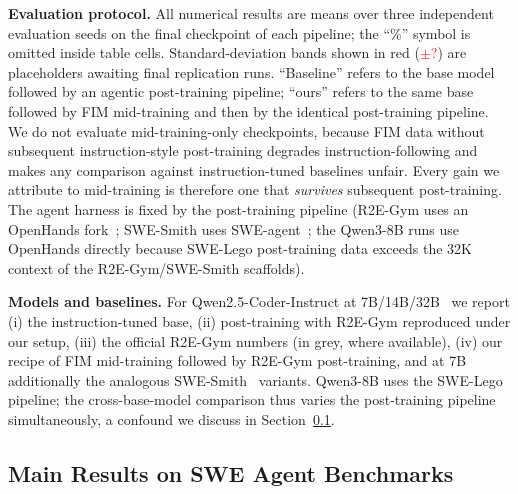 \textbf{Evaluation protocol.}
All numerical results are means over three independent evaluation seeds
on the final checkpoint of each pipeline; the ``\%'' symbol is omitted
inside table cells. Standard-deviation bands shown in red
(\textcolor{red}{$\pm$?}) are placeholders awaiting final replication
runs. ``Baseline'' refers to the base model followed by an agentic
post-training pipeline; ``ours'' refers to the same base followed by FIM
mid-training and then by the identical post-training pipeline. We do not
evaluate mid-training-only checkpoints, because FIM data without
subsequent instruction-style post-training degrades instruction-following
and makes any comparison against instruction-tuned baselines unfair.
Every gain we attribute to mid-training is therefore one that
\emph{survives} subsequent post-training. The agent harness is fixed by
the post-training pipeline (R2E-Gym uses an OpenHands fork~\citep{openhands,
r2egym}; SWE-Smith uses SWE-agent~\citep{sweagent}; the Qwen3-8B runs use
OpenHands directly because SWE-Lego post-training data exceeds the 32K
context of the R2E-Gym/SWE-Smith scaffolds).

\textbf{Models and baselines.}
For Qwen2.5-Coder-Instruct at 7B/14B/32B~\citep{qwencoder} we report
(i) the instruction-tuned base, (ii) post-training with R2E-Gym
reproduced under our setup, (iii) the official R2E-Gym numbers (in grey,
where available), (iv) our recipe of FIM mid-training followed by
R2E-Gym post-training, and at 7B additionally the analogous
SWE-Smith~\citep{swesmith} variants. Qwen3-8B uses the
SWE-Lego~\citep{swelego} pipeline; the cross-base-model comparison thus
varies the post-training pipeline simultaneously, a confound we discuss
in Section~\ref{sec:exp:main}.

\vspace{-0.5ex}
\subsection{Main Results on SWE Agent Benchmarks}
\label{sec:exp:main}

